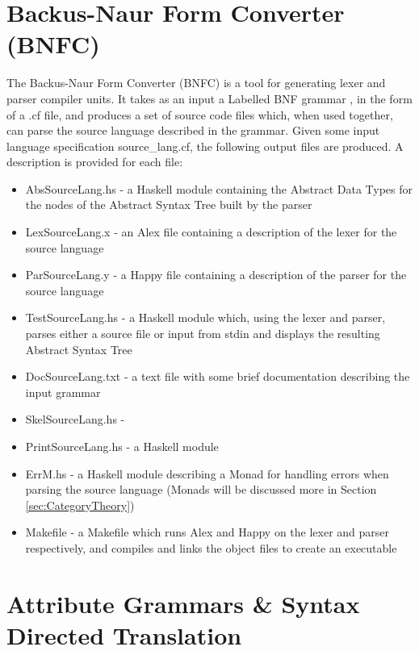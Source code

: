 \documentclass{UoYCSproject}
\begin{document}
\section{Backus-Naur Form Converter (BNFC)}
\label{sec:BNFC}

The Backus-Naur Form Converter (BNFC) is a tool for generating lexer and parser
compiler units. It takes as an input a Labelled BNF grammar \cite{LBNFReport},
in the form of a {\ttfamily .cf} file, and produces a set of source code files
which, when used together, can parse the source language described in the
grammar. Given some input language specification {\ttfamily source\_lang.cf},
the following output files are produced. A description is provided for each
file:
\begin{itemize}
    \item {\ttfamily AbsSourceLang.hs} - a Haskell module containing the Abstract
        Data Types for the nodes of the Abstract Syntax Tree built by the
        parser
    \item {\ttfamily LexSourceLang.x} - an Alex file containing a description
        of the lexer for the source language
    \item {\ttfamily ParSourceLang.y} - a Happy file containing a description
        of the parser for the source language
    \item {\ttfamily TestSourceLang.hs} - a Haskell module which, using the lexer
        and parser, parses either a source file or input from stdin and
        displays the resulting Abstract Syntax Tree
    \item {\ttfamily DocSourceLang.txt} - a text file with some brief
        documentation describing the input grammar
    \item {\ttfamily SkelSourceLang.hs} -
    \item {\ttfamily PrintSourceLang.hs} - a Haskell module 
    \item {\ttfamily ErrM.hs} - a Haskell module describing a Monad for handling
        errors when parsing the source language (Monads will be discussed more
        in Section \ref{sec:CategoryTheory})
    \item {\ttfamily Makefile} - a Makefile which runs Alex and Happy on the
        lexer and parser respectively, and compiles and links the object files
        to create an executable
\end{itemize}

\section{Attribute Grammars \& Syntax Directed Translation}
\cite{KnuthGrammars}\cite{DragonBook}
\end{document}
